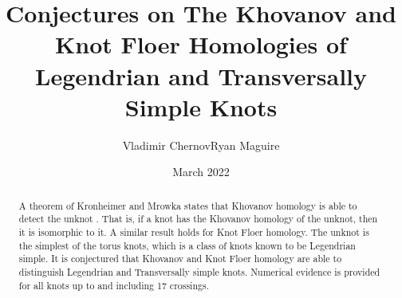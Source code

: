 \documentclass{article}
\title{Conjectures on The Khovanov and Knot Floer Homologies of
       Legendrian and Transversally Simple Knots}
\author{Vladimir Chernov\hspace{2em}Ryan Maguire}
\date{March 2022}
\theoremstyle{plain}
\begin{document}
    \maketitle
    \tableofcontents
    \begin{abstract}
        \noindent
        A theorem of Kronheimer and Mrowka states that Khovanov homology is
        able to detect the unknot \cite{kronheimermrowka2010}.
        That is, if a knot has the Khovanov homology of the unknot, then it is
        isomorphic to it. A similar result holds for Knot Floer
        homology. The unknot is the simplest of the torus knots, which is a
        class of knots known to be Legendrian simple. It is conjectured that
        Khovanov and Knot Floer homology are able to distinguish Legendrian
        and Transversally simple knots. Numerical evidence is provided for
        all knots up to and including 17 crossings. 
	\end{abstract}
\end{document}
